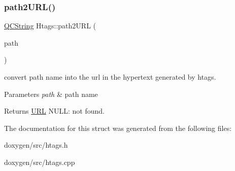 \subsubsection{\texorpdfstring{path2URL()}{path2URL()}}
{\footnotesize\ttfamily \mbox{\hyperlink{class_q_c_string}{Q\+C\+String}} Htags\+::path2\+U\+RL (\begin{DoxyParamCaption}\item[{const \mbox{\hyperlink{class_q_c_string}{Q\+C\+String}} \&}]{path }\end{DoxyParamCaption})\hspace{0.3cm}{\ttfamily [static]}}

convert path name into the url in the hypertext generated by htags. 
\begin{DoxyParams}{Parameters}
{\em path} & path name \\
\hline
\end{DoxyParams}
\begin{DoxyReturn}{Returns}
\mbox{\hyperlink{struct_u_r_l}{U\+RL}} N\+U\+LL\+: not found. 
\end{DoxyReturn}


The documentation for this struct was generated from the following files\+:\begin{DoxyCompactItemize}
\item 
doxygen/src/htags.\+h\item 
doxygen/src/htags.\+cpp\end{DoxyCompactItemize}
